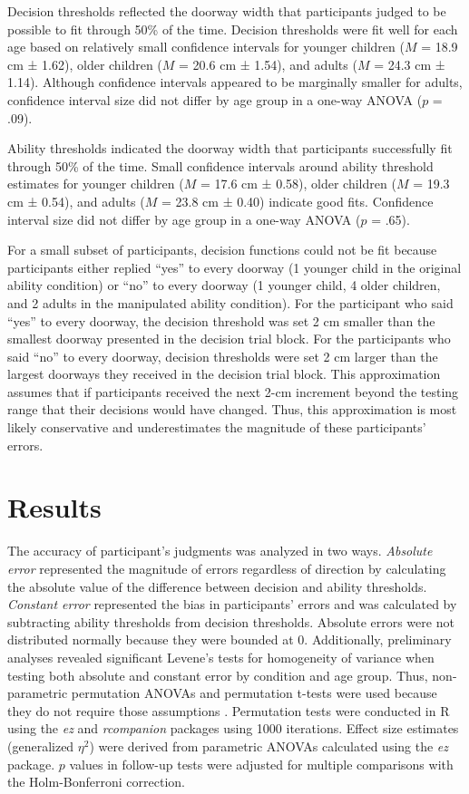 \documentclass[a4paper,man,natbib,floatsintext,noextraspace]{apa6}
\begin{document}
Decision thresholds reflected the doorway width that participants judged to be possible to fit through 50\% of the time. Decision thresholds were fit well for each age based on relatively small confidence intervals for younger children ($M$ = 18.9 cm ± 1.62), older children ($M$ = 20.6 cm ± 1.54), and adults ($M$ = 24.3 cm ± 1.14). Although confidence intervals appeared to be marginally smaller for adults, confidence interval size did not differ by age group in a one-way ANOVA ($p$ = .09). 

Ability thresholds indicated the doorway width that participants successfully fit through 50\% of the time. Small confidence intervals around ability threshold estimates for younger children ($M$ = 17.6 cm ± 0.58), older children ($M$ = 19.3 cm ± 0.54), and adults ($M$ = 23.8 cm ± 0.40) indicate good fits. Confidence interval size did not differ by age group in a one-way ANOVA ($p$ = .65).

For a small subset of participants, decision functions could not be fit because participants either replied “yes” to every doorway (1 younger child in the original ability condition) or “no” to every doorway (1 younger child, 4 older children, and 2 adults in the manipulated ability condition). For the participant who said “yes” to every doorway, the decision threshold was set 2 cm smaller than the smallest doorway presented in the decision trial block. For the participants who said “no” to every doorway, decision thresholds were set 2 cm larger than the largest doorways they received in the decision trial block. This approximation assumes that if participants received the next 2-cm increment beyond the testing range that their decisions would have changed. Thus, this approximation is most likely conservative and underestimates the magnitude of these participants’ errors. 

\section{Results}

The accuracy of participant’s judgments was analyzed in two ways. \textit{Absolute error} represented the magnitude of errors regardless of direction by calculating the absolute value of the difference between decision and ability thresholds. \textit{Constant error} represented the bias in participants’ errors and was calculated by subtracting ability thresholds from decision thresholds. Absolute errors were not distributed normally because they were bounded at 0. Additionally, preliminary analyses revealed significant Levene’s tests for homogeneity of variance when testing both absolute and constant error by condition and age group. Thus, non-parametric permutation ANOVAs and permutation t-tests were used because they do not require those assumptions \citep{Edgington}. Permutation tests were conducted in R using the \textit{ez} and \textit{rcompanion} packages using 1000 iterations. Effect size estimates (generalized $\eta^{2}$) were derived from parametric ANOVAs calculated using the \textit{ez} package. $p$ values in follow-up tests were adjusted for multiple comparisons with the Holm-Bonferroni correction.
\end{document}
